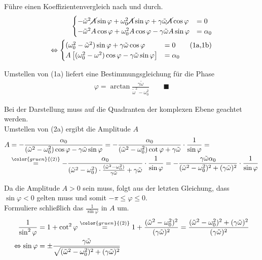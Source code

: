 \documentclass{article}
\newcommand{\lreck}[1]{\left[#1\right]}
\newcommand{\comment}[1]{{\color{gruen} {#1}}}
\begin{document}
{	Führe einen Koeffizientenvergleich nach  und  durch.
		\begin{align*}
			\begin{cases}
				-\tilde{\omega}^2 \cancel{A} \sin\varphi + \omega_0^2 \cancel{A} \sin\varphi + \gamma\tilde{\omega} \cancel{A} \cos\varphi &= 0 \\
				-\tilde{\omega}^2 A \cos\varphi + \omega_0^2 A \cos\varphi - \gamma\tilde{\omega} A \sin\varphi &= \alpha_0
			\end{cases} \\
			\Leftrightarrow
			\begin{cases}
				(\omega_0^2 - \tilde{\omega}^2) \sin\varphi + \gamma\tilde{\omega} \cos\varphi &= 0 \tag{1a,1b}\\
				A\lreck{ (\omega_0^2 - \omega^2) \cos\varphi - \gamma\tilde{\omega} \sin\varphi } &= \alpha_0
			\end{cases}
		\end{align*}

	Umstellen von (1a) liefert eine Bestimmungsgleichung für die Phase
		\begin{align*}
			\varphi = \arctan \frac{\gamma\tilde{\omega}}{\tilde{\omega}^2 - \omega_0^2} \tag{2} \qquad \blacksquare
		\end{align*}
	
	\textcolor{gruen}{Bei der Darstellung muss auf die Quadranten der komplexen Ebene geachtet werden.}\\
	Umstellen von (2a) ergibt die Amplitude $A$
		\begin{align*}
			A &= - \frac{\alpha_0}{(\tilde{\omega}^2 - \omega_0^2) \cos\varphi - \gamma\tilde{\omega} \sin\varphi} = - \frac{\alpha_0}{(\tilde{\omega}^2 - \omega_0^2) \cot\varphi + \gamma\tilde{\omega}} \cdot \frac{1}{\sin\varphi} = \\
			&\stackrel{\comment{(2)}}{=} - \frac{\alpha_0}{(\tilde{\omega}^2 - \omega_0^2) \cdot \frac{(\tilde{\omega}^2 - \omega_0^2)}{\gamma\tilde{\omega}} + \gamma\tilde{\omega}} \cdot \frac{1}{\sin\varphi} = -\frac{\gamma\tilde{\omega}\alpha_0}{(\tilde{\omega}^2 - \omega_0^2)^2 + (\gamma\tilde{\omega})^2} \cdot \frac{1}{\sin\varphi}
		\end{align*}
	
	Da die Amplitude $A>0$ sein muss, folgt aus der letzten Gleichung, dass $\sin\varphi < 0$ gelten muss und somit $-\pi \leq \varphi \leq 0$.\\
	Formuliere schließlich das $\frac{1}{\sin\varphi}$ in $A$ um.
		\begin{align*}
			\frac{1}{\sin^2\varphi} &= 1 + \cot^2\varphi \stackrel{\comment{(2)}}{=} 1 + \frac{(\tilde{\omega}^2 - \omega_0^2)^2}{(\gamma\tilde{\omega})^2} = \frac{(\tilde{\omega}^2 - \omega_0^2)^2 + (\gamma\tilde{\omega})^2}{(\gamma\tilde{\omega})^2} \\
			\Leftrightarrow \sin\varphi &= \pm \frac{\gamma\tilde{\omega}}{\sqrt{ (\tilde{\omega}^2 - \omega_0^2)^2 + (\gamma\tilde{\omega})^2 }}
		\end{align*}
	
}
\end{document}
